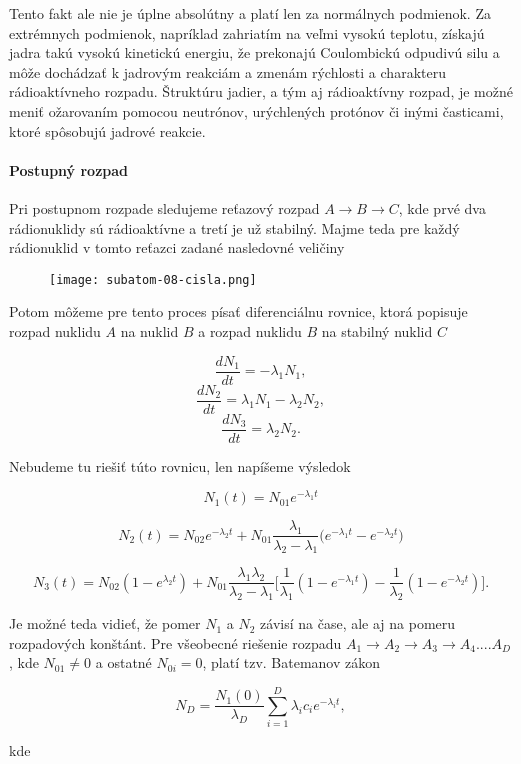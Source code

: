 \documentclass[../../main.tex]{subfiles}
\begin{document}
Tento fakt ale nie je úplne absolútny a platí len za normálnych podmienok. Za extrémnych podmienok, napríklad zahriatím na veľmi vysokú teplotu, získajú jadra takú vysokú kinetickú energiu, že prekonajú Coulombickú odpudivú silu a môže dochádzať k jadrovým reakciám a zmenám rýchlosti a charakteru rádioaktívneho rozpadu. Štruktúru jadier, a tým aj rádioaktívny rozpad, je možné meniť ožarovaním pomocou neutrónov, urýchlených protónov či inými časticami, ktoré spôsobujú jadrové reakcie.

\paragraph{Postupný rozpad}
Pri postupnom rozpade sledujeme reťazový rozpad $A \rightarrow B \rightarrow C$, kde prvé dva rádionuklidy sú rádioaktívne a tretí je už stabilný. Majme teda pre každý rádionuklid v tomto reťazci zadané nasledovné veličiny

\begin{figure}[!h]
\texttt{[image: subatom-08-cisla.png]}
\centering
\end{figure}

Potom môžeme pre tento proces písať diferenciálnu rovnice, ktorá popisuje rozpad nuklidu $A$ na nuklid $B$ a rozpad nuklidu $B$ na stabilný nuklid $C$

$$ \frac{dN_1}{dt} = -\lambda_1 N_1, $$
$$ \frac{dN_2}{dt} = \lambda_1 N_1 - \lambda_2 N_2, $$
$$ \frac{dN_3}{dt} = \lambda_2 N_2. $$

Nebudeme tu riešiť túto rovnicu, len napíšeme výsledok

$$ N_1(t) = N_{01}e^{-\lambda_1 t} $$

$$ N_2(t) = N_{02}e^{-\lambda_2 t} + N_{01}\frac{\lambda_1}{\lambda_2 - \lambda_1} \big( e^{-\lambda_1 t} - e^{-\lambda_2 t}  \big)$$

$$ N_3(t) = N_{02}(1-e^{\lambda_2t}) + N_{01}\frac{\lambda_1 \lambda_2}{\lambda_2 - \lambda_1} \bigg[ \frac{1}{\lambda_1}(1-e^{-\lambda_1t})   -\frac{1}{\lambda_2}(1-e^{-\lambda_2t}) \bigg] .$$

Je možné teda vidieť, že pomer $N_1$ a $N_2$ závisí na čase, ale aj na pomeru rozpadových konštánt. Pre všeobecné riešenie rozpadu $A_1 \rightarrow A_2 \rightarrow A_3 \rightarrow A_4 .... A_D$, kde $N_{01}\neq 0$ a ostatné $N_{0i}=0$, platí tzv. Batemanov zákon 

$$ N_D = \frac{N_1(0)}{\lambda_D} \sum_{i=1}^D \lambda_ic_ie^{-\lambda_it}, $$

kde
\end{document}
